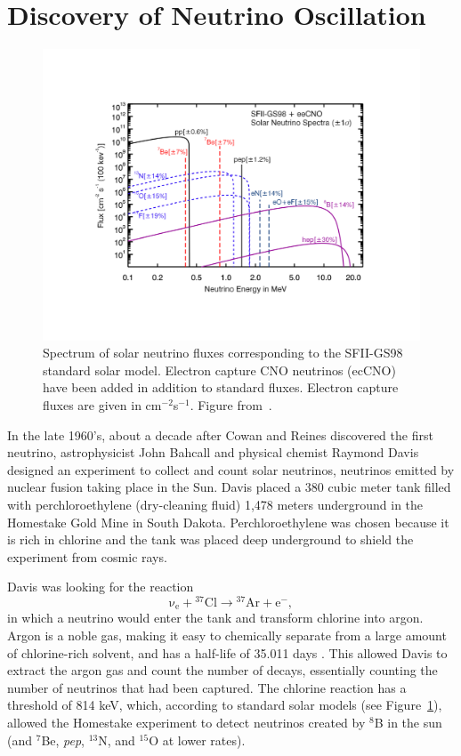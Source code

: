 \section{Discovery of Neutrino Oscillation} \label{sec:NeutrinoOsc}

\begin{figure}[h]
	\centering
	\includegraphics[width=0.7\linewidth]{tex/2-neutrinos-images/SolarFlux}
	\caption{Spectrum of solar neutrino fluxes corresponding to the SFII-GS98 standard solar model. Electron capture CNO neutrinos (ecCNO) have been added in addition to standard fluxes. Electron capture fluxes are given in cm$^{-2}$s$^{-1}$. Figure from~\cite{Serenelli:2016dgz}.}
	\label{fig:solarflux}
\end{figure}

In the late 1960's, about a decade after Cowan and Reines discovered the first neutrino, astrophysicist John Bahcall and physical chemist Raymond Davis designed an experiment to collect and count solar neutrinos, neutrinos emitted by nuclear fusion taking place in the Sun. 
Davis placed a 380 cubic meter tank filled with perchloroethylene (dry-cleaning fluid) 1,478 meters underground in the Homestake Gold Mine in South Dakota. 
Perchloroethylene was chosen because it is rich in chlorine and the tank was placed deep underground to shield the experiment from cosmic rays. 

Davis was looking for the reaction 
\begin{equation}
	\mathrm{\nu _{e}+ {^{37}Cl} \rightarrow  {^{37}Ar+e^{-}}},
	\label{eq:ClAr}
\end{equation}
in which a neutrino would enter the tank and transform chlorine into argon. 
Argon is a noble gas, making it easy to chemically separate from a large amount of chlorine-rich solvent, and has a half-life of 35.011 days \cite{NuclideChart}.
This allowed Davis to extract the argon gas and count the number of decays, essentially counting the number of neutrinos that had been captured.
The chlorine reaction has a threshold of 814 keV, which, according to standard solar models (see Figure~\ref{fig:solarflux}), allowed the Homestake experiment to detect neutrinos created by $^8$B in the sun (and $^7$Be, \textit{pep}, $^{13}$N, and $^{15}$O at lower rates).

